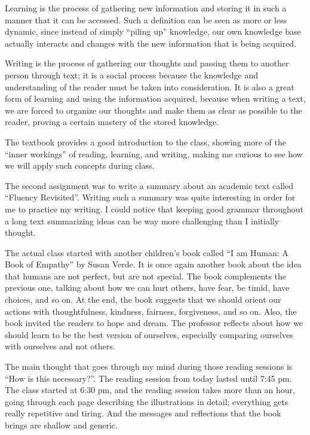 Learning is the process of gathering new information and storing it in such a manner that it can be accessed. Such a definition can be seen as more or less dynamic, since instead of simply ``piling up'' knowledge, our own knowledge base actually interacts and changes with the new information that is being acquired.

Writing is the process of gathering our thoughts and passing them to another person through text; it is a social process because the knowledge and understanding of the reader must be taken into consideration. It is also a great form of learning and using the information acquired, because when writing a text, we are forced to organize our thoughts and make them as clear as possible to the reader, proving a certain mastery of the stored knowledge.

The textbook provides a good introduction to the class, showing more of the ``inner workings'' of reading, learning, and writing, making me curious to see how we will apply such concepts during class.

The second assignment was to write a summary about an academic text called ``Fluency Revisited''. Writing such a summary was quite interesting in order for me to practice my writing. I could notice that keeping good grammar throughout a long text summarizing ideas can be way more challenging than I initially thought.

The actual class started with another children's book called ``I am Human: A Book of Empathy'' by Susan Verde. It is once again another book about the idea that humans are not perfect, but are not special. The book complements the previous one, talking about how we can hurt others, have fear, be timid, have choices, and so on. At the end, the book suggests that we should orient our actions with thoughtfulness, kindness, fairness, forgiveness, and so on. Also, the book invited the readers to hope and dream. The professor reflects about how we should learn to be the best version of ourselves, especially comparing ourselves with ourselves and not others.

The main thought that goes through my mind during those reading sessions is ``How is this necessary?''. The reading session from today lasted until 7:45 pm. The class started at 6:30 pm, and the reading session takes more than an hour, going through each page describing the illustrations in detail; everything gets really repetitive and tiring. And the messages and reflections that the book brings are shallow and generic.

